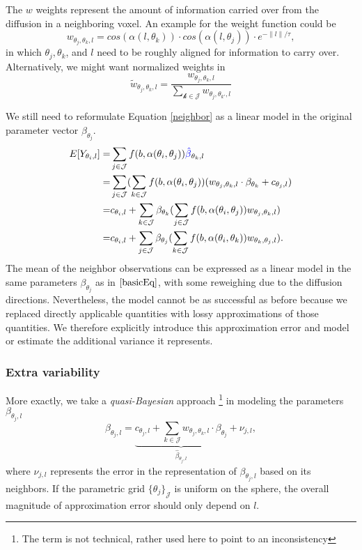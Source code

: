 \documentclass[11pt]{amsart}
\newcommand{\tj}{\theta_j}
\newcommand{\ti}{\theta_i}
\newcommand{\tk}{\theta_k}
\newcommand{\ytil}{Y_{\theta_i,l}}
\begin{document}
The $w$ weights represent the amount of information carried over from the diffusion in a neighboring voxel. 
An example for the weight function could be
\[ w_{\tj,\tk, l}  = cos(\alpha(l,\tk)) \cdot cos(\alpha(l, \tj)) \cdot e^{-\|l\|/\tau}, \]
in which $\tj, \tk$, and $l$ need to be roughly aligned for information to carry over. 
Alternatively, we might want normalized weights in 
\[\tilde{w}_{\tj,\tk, l}  = \frac{w_{\tj,\tk, l}}{\sum_\mathcal{k \in \mathcal{J}} w_{\tj,\theta_{k'}, l}} \]

We still need to reformulate Equation \eqref{neighbor} as a linear model in the original parameter vector $\beta_{\tj}$.
\begin{eqnarray*}
E[\ytil] = & \sum_{j \in \mathcal{J}}  f(b, \alpha(\ti, \tj)) \textcolor{blue}{\hat{\beta}}_{\tk,l} \\
 = & \sum_{j \in \mathcal{J}} ( \sum_{k\in\mathcal{J}} f(b, \alpha(\ti, \tj)) ( w_{\tj,\tk, l} \cdot \beta_{\tk} + c_{\tj,l})\\
 = & c_{\ti,l} +  \sum_{k\in\mathcal{J}}  \beta_{\tk}  (\sum_{j \in \mathcal{J}}  f(b, \alpha(\ti, \tj))  w_{\tj,\tk, l})\\
  = & c_{\ti,l} +  \sum_{j\in\mathcal{J}}  \beta_{\tj}  (\sum_{k\in \mathcal{J}}  f(b, \alpha(\ti, \tk))  w_{\tk,\tj, l}).
\end{eqnarray*}   
The mean of the neighbor observations can be expressed as a linear model in the same parameters $\beta_{\tj}$ as in $\eqref{basicEq}$,
with some reweighing due to the diffusion directions. Nevertheless, the model cannot be as successful as before because we replaced 
directly applicable quantities with lossy approximations of those quantities. We therefore explicitly introduce this approximation 
error and model or estimate the additional variance it represents. 

\subsubsection{Extra variability}
More exactly, we take a \emph{quasi-Bayesian} approach \footnote{The term is not technical, rather used here to point to an inconsistency}
in modeling the parameters $\beta_{\tj,l}$
\begin{equation}
\beta_{\tj,l} = \underbrace{c_{\tj,l} + \sum_{k\in\mathcal{J}} w_{\theta_j,\theta_k, l} \cdot \beta_{\tj}}_{\hat{\beta}_{\tj,l}} + \nu_{j,l}, 
\label{rexpress}
\end{equation}
where $\nu_{j,l}$ represents the error in the representation of $\beta_{\tj,l}$ based on its neighbors. 
If the parametric grid $\{\tj\}_\mathcal{J}$ is uniform on the sphere, the overall magnitude of approximation error 
should only depend on $l$. 
\end{document}
